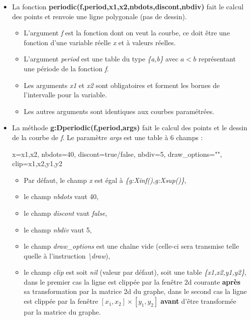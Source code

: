 \begin{itemize}
\item La fonction \textbf{periodic(f,period,x1,x2,nbdots,discont,nbdiv)} fait le calcul des points et renvoie une ligne polygonale (pas de dessin).

  \begin{itemize}
    \item L'argument \emph{f} est la fonction dont on veut la courbe, ce doit être une fonction d'une variable réelle \emph{x} et à valeurs réelles.
    \item L'argument \emph{period} est une table du type \emph{\{a,b\}} avec \(a<b\) représentant une période de la fonction \emph{f}.
    \item Les arguments \emph{x1} et \emph{x2} sont obligatoires et forment les bornes de l'intervalle pour la variable.
    \item Les autres arguments sont identiques aux courbes paramétrées.
  \end{itemize}
\item La méthode \textbf{g:Dperiodic(f,period,args)} fait le calcul des points et le dessin de la courbe de \emph{f}. Le paramètre \emph{args} est une table à 6 champs :

\begin{TeXcode}
  { x={x1,x2}, nbdots=40, discont=true/false, nbdiv=5, draw_options="", clip={x1,x2,y1,y2} }
\end{TeXcode}

  \begin{itemize}
      \item Par défaut, le champ \emph{x} est égal à \emph{\{g:Xinf(),g:Xsup()\}},
      \item le champ \emph{nbdots} vaut 40, 
      \item le champ \emph{discont} vaut \emph{false}, 
      \item le champ \emph{nbdiv} vaut 5, 
      \item le champ \emph{draw\_options} est une chaîne vide (celle-ci sera transmise telle quelle à l'instruction \emph{\textbackslash draw}),
      \item le champ \emph{clip} est soit \emph{nil} (valeur par défaut), soit une table \emph{\{x1,x2,y1,y2\}}, dans le premier cas la ligne est clippée par la fenêtre 2d courante \textbf{après} sa transformation par la matrice 2d du graphe, dans le second cas la ligne est clippée par la fenêtre $[x_1,x_2]\times[y_1,y_2]$ \textbf{avant} d'être transformée par la matrice du graphe.

  \end{itemize}

\end{itemize}

